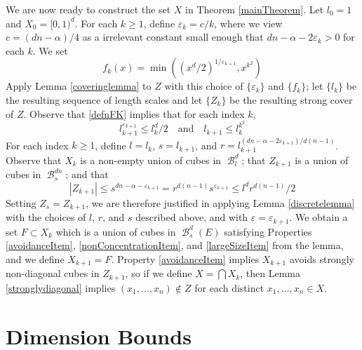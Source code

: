 \documentclass[dvipsnames,letterpaper,12pt]{article}
\numberwithin{equation}{section}
\theoremstyle{plain}
\DeclareMathOperator{\B}{\mathcal{B}}
\begin{document}
We are now ready to construct the set $X$ in Theorem \ref{mainTheorem}. Let $l_0 = 1$ and $X_0 = [0,1)^d$. For each $k \geq 1$, define $\varepsilon_k = c/k$, where we view $c = (dn - \alpha)/4$ as a irrelevant constant small enough that $dn - \alpha - 2\varepsilon_k > 0$ for each $k$. We set
%
\begin{equation}\label{defnFK}
	f_k(x) = \min \left( (x^d/2)^{1/\varepsilon_{k+1}}, x^{k^2} \right)
\end{equation}
%
Apply Lemma \ref{coveringlemma} to $Z$ with this choice of $\{\varepsilon_k\}$ and $\{f_k\}$; let $\{l_k\}$ be the resulting sequence of length scales and let $\{Z_k\}$ be the resulting strong cover of $Z$. Observe that \eqref{defnFK} implies that for each index $k$,
%
\begin{equation} \label{boundOnLk}
	l_{k+1}^{\varepsilon_{k+1}} \leq l_k^d/2 \quad \text{and} \quad l_{k+1} \leq l_k^{k^2}
\end{equation}
%
For each index $k \geq 1$, define $l = l_k$, $s = l_{k+1}$, and $r = l_{k+1}^{(dn - \alpha - 2\varepsilon_{k+1})/d(n-1)}$. Observe that $X_k$ is a non-empty union of cubes in $\B^d_l$; that $Z_{k+1}$ is a union of cubes in $\B^{dn}_s$; and that
%
\[ |Z_{k+1}| \leq s^{dn - \alpha - \varepsilon_{k+1}} = r^{d(n-1)} s^{\varepsilon_{k+1}} \leq l^d r^{d(n-1)}/2 \]
%
Setting $Z_s = Z_{k+1}$, we are therefore justified in applying Lemma \ref{discretelemma} with the choices of $l$, $r$, and $s$ described above, and with $\varepsilon = \varepsilon_{k+1}$. We obtain a set $F \subset X_k$ which is a union of cubes in $\B^d_s(E)$ satisfying Properties \ref{avoidanceItem}, \ref{nonConcentrationItem}, and \ref{largeSizeItem} from the lemma, and we define $X_{k+1} = F$. Property \ref{avoidanceItem} implies $X_{k+1}$ avoids strongly non-diagonal cubes in $Z_{k+1}$, so if we define $X = \bigcap X_k$, then Lemma \ref{stronglydiagonal} implies $(x_1, \dots, x_n) \not \in Z$ for each distinct $x_1, \dots, x_n \in X$.









\section{Dimension Bounds}\label{dimensionsection}
\end{document}
